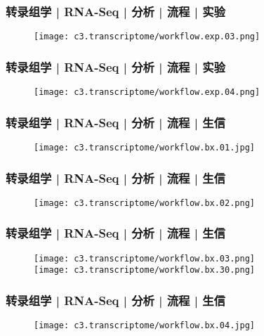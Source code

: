 \begin{frame}
  \frametitle{转录组学 | RNA-Seq | 分析 | 流程 | 实验}
  \begin{figure}
    \centering
    \texttt{[image: c3.transcriptome/workflow.exp.03.png]}
  \end{figure}
\end{frame}

\begin{frame}
  \frametitle{转录组学 | RNA-Seq | 分析 | 流程 | 实验}
  \begin{figure}
    \centering
    \texttt{[image: c3.transcriptome/workflow.exp.04.png]}
  \end{figure}
\end{frame}

\begin{frame}
  \frametitle{转录组学 | RNA-Seq | 分析 | 流程 | 生信}
  \begin{figure}
    \centering
    \texttt{[image: c3.transcriptome/workflow.bx.01.jpg]}
  \end{figure}
\end{frame}

\begin{frame}
  \frametitle{转录组学 | RNA-Seq | 分析 | 流程 | 生信}
  \begin{figure}
    \centering
    \texttt{[image: c3.transcriptome/workflow.bx.02.png]}
  \end{figure}
\end{frame}

\begin{frame}
  \frametitle{转录组学 | RNA-Seq | 分析 | 流程 | 生信}
  \begin{figure}
    \centering
    \texttt{[image: c3.transcriptome/workflow.bx.03.png]}\\
    \vspace{1em}
    \texttt{[image: c3.transcriptome/workflow.bx.30.png]}
  \end{figure}
\end{frame}

\begin{frame}
  \frametitle{转录组学 | RNA-Seq | 分析 | 流程 | 生信}
  \begin{figure}
    \centering
    \texttt{[image: c3.transcriptome/workflow.bx.04.jpg]}
  \end{figure}
\end{frame}

